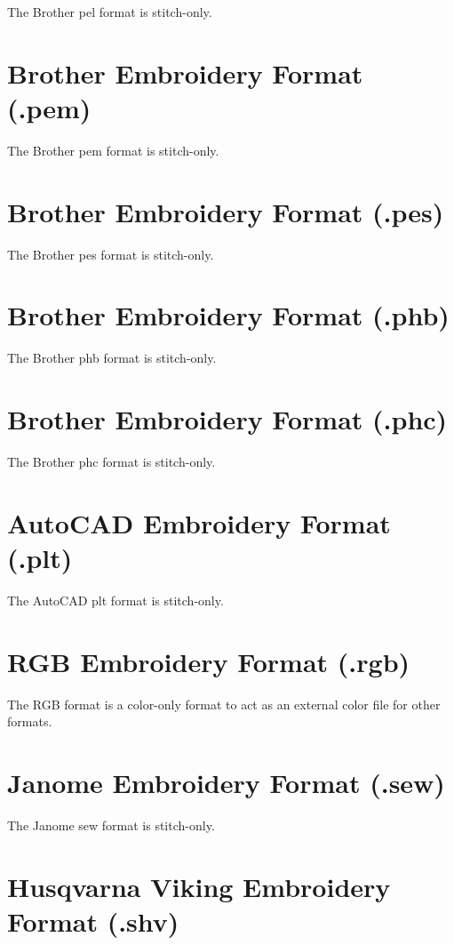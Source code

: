 \documentclass{report}
\begin{document}
The Brother pel format is stitch-only.

\section{Brother Embroidery Format (.pem)}

The Brother pem format is stitch-only.

\section{Brother Embroidery Format (.pes)}

The Brother pes format is stitch-only.

\section{Brother Embroidery Format (.phb)}

The Brother phb format is stitch-only.

\section{Brother Embroidery Format (.phc)}

The Brother phc format is stitch-only.

\section{AutoCAD Embroidery Format (.plt)}

The AutoCAD plt format is stitch-only.

\section{RGB Embroidery Format (.rgb)}

The RGB format is a color-only format to act as an external color file for other formats.

\section{Janome Embroidery Format (.sew)}

The Janome sew format is stitch-only.

\section{Husqvarna Viking Embroidery Format (.shv)}
\end{document}
